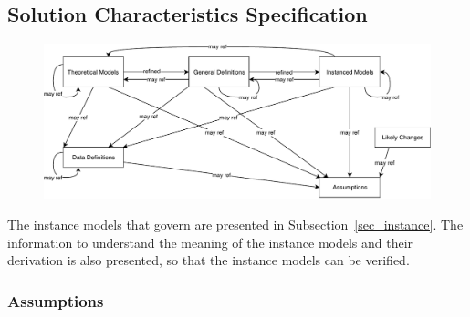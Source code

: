 \documentclass[12pt]{article}
\begin{document}
\subsection{Solution Characteristics Specification}

\begin{figure}[H]
  \includegraphics[scale=0.9]{RelationsBetweenTM_GD_IM_DD_A.pdf}
\end{figure}

The instance models that govern \progname{} are presented in
Subsection~\ref{sec_instance}.  The information to understand the meaning of the
instance models and their derivation is also presented, so that the instance
models can be verified.

\subsubsection{Assumptions} \label{sec_assumpt}
\end{document}
